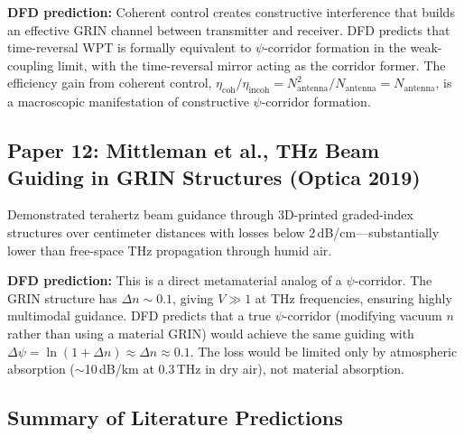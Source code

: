 \documentclass[journal,twocolumn]{IEEEtran}
\begin{document}
\textbf{DFD prediction:} Coherent control creates constructive
interference that builds an effective GRIN channel between transmitter
and receiver. DFD predicts that time-reversal WPT is formally
equivalent to $\psi$-corridor formation in the weak-coupling limit,
with the time-reversal mirror acting as the corridor former. The
efficiency gain from coherent control,
$\eta_\text{coh}/\eta_\text{incoh} = N_\text{antenna}^2/N_\text{antenna}
= N_\text{antenna}$, is a macroscopic manifestation of constructive
$\psi$-corridor formation.

\subsection{Paper 12: Mittleman et al., THz Beam Guiding
in GRIN Structures (Optica 2019)}

Demonstrated terahertz beam guidance through 3D-printed graded-index
structures over centimeter distances with losses below
2\,dB/cm---substantially lower than free-space THz propagation
through humid air.

\textbf{DFD prediction:} This is a direct metamaterial analog of a
$\psi$-corridor. The GRIN structure has $\Delta n \sim 0.1$, giving
$V \gg 1$ at THz frequencies, ensuring highly multimodal guidance.
DFD predicts that a true $\psi$-corridor (modifying vacuum $n$ rather
than using a material GRIN) would achieve the same guiding with
$\Delta\psi = \ln(1 + \Delta n) \approx \Delta n \approx 0.1$.
The loss would be limited only by atmospheric absorption
($\sim$10\,dB/km at 0.3\,THz in dry air), not material absorption.

\subsection{Summary of Literature Predictions}
\end{document}
